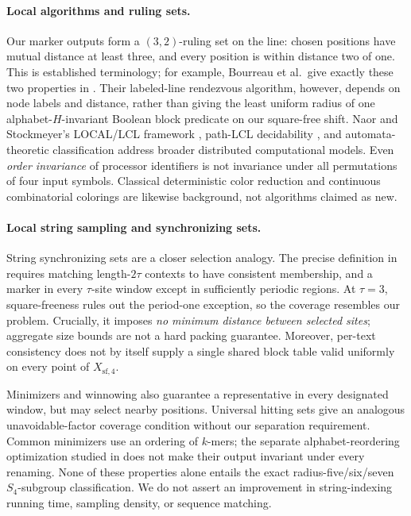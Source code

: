\documentclass[11pt]{article}
\theoremstyle{remark}
\newcommand{\Xsf}{X_{\mathrm{sf},4}}
\begin{document}
\paragraph{Local algorithms and ruling sets.}
Our marker outputs form a $(3,2)$-ruling set on the line:
chosen positions have mutual distance at least three,
and every position is within distance two of one.
This is established terminology; for example,
Bourreau et al.\ give exactly these two properties in
\cite[Definition~6]{bourreau2026ruling}. Their
labeled-line rendezvous algorithm, however, depends
on node labels and distance, rather than giving the
least uniform radius of one alphabet-$H$-invariant
Boolean block predicate on our square-free shift.
Naor and Stockmeyer's LOCAL/LCL framework
\cite{naor1995local}, path-LCL decidability
\cite{balliu2019paths}, and automata-theoretic
classification \cite{chang2023automata} address
broader distributed computational models.
Even \emph{order invariance} of processor identifiers
is not invariance under all permutations of four
input symbols. Classical deterministic color
reduction \cite{colevishkin1986} and continuous
combinatorial colorings \cite{bernshteyn2023probabilistic}
are likewise background, not algorithms claimed as new.

\paragraph{Local string sampling and synchronizing sets.}
String synchronizing sets
\cite{kempa2019synchronizing,kociumaka2024ipm}
are a closer selection analogy. The precise
definition in \cite[Definition~5.1]{ellert2026synchronizing}
requires matching length-$2\tau$ contexts to
have consistent membership, and a marker in every
$\tau$-site window except in sufficiently periodic
regions. At $\tau=3$, square-freeness rules out the
period-one exception, so the coverage resembles
our problem. Crucially, it imposes \emph{no
minimum distance between selected sites}; aggregate
size bounds are not a hard packing guarantee.
Moreover, per-text consistency does not by itself
supply a single shared block table valid uniformly
on every point of $\Xsf$.

Minimizers and winnowing
\cite{schleimer2003winnowing,shaw2022localselection}
also guarantee a representative in every
designated window, but may select nearby positions.
Universal hitting sets \cite{zheng2021uhs}
give an analogous unavoidable-factor coverage
condition without our separation requirement.
Common minimizers use an ordering of $k$-mers;
the separate alphabet-reordering optimization
studied in \cite{verbeek2026reordering} does not
make their output invariant under every renaming.
None of these properties alone entails the exact
radius-five/six/seven $S_4$-subgroup classification.
We do not assert an improvement in string-indexing
running time, sampling density, or sequence matching.
\end{document}
